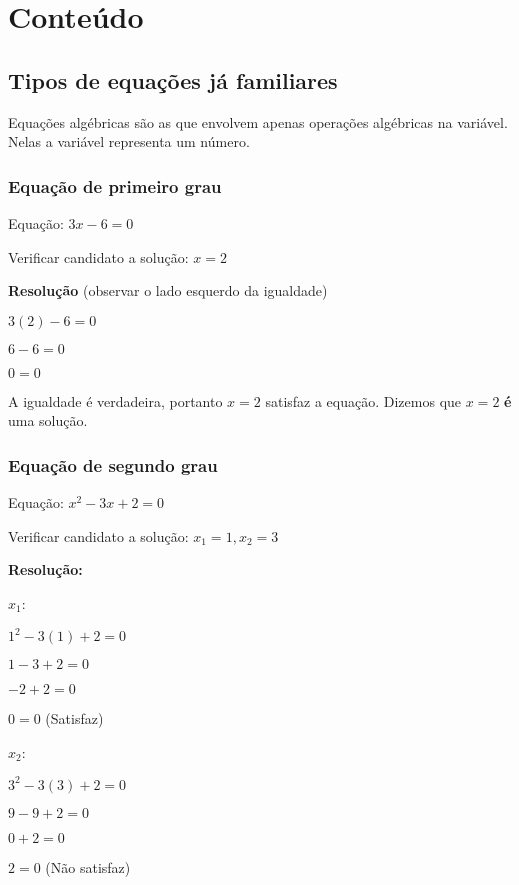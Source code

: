 \documentclass[a4paper]{article}
\begin{document}


\section{Conteúdo}

\subsection{Tipos de equações já familiares}

Equações algébricas são as que envolvem apenas operações algébricas na
variável. Nelas a variável representa um número.

\subsubsection{Equação de primeiro grau}

Equação: $3x -6 = 0$

Verificar candidato a solução: $x=2$

{\bf Resolução} (observar o lado esquerdo da igualdade)

$3(2) - 6 =0$

$ 6-6 =0$

$0 = 0$

A igualdade é verdadeira, portanto $x=2$ satisfaz a equação. Dizemos
que $x=2$ {\bf é} uma solução.

\newpage
\subsubsection{Equação de segundo grau}

Equação: $x^2 - 3x + 2 = 0$

Verificar candidato a solução: $x_1 = 1, x_2 = 3$

{\bf Resolução:}
\begin{multicols}{2}
$x_1$:

$1^2 -3(1) + 2 = 0$

$1 - 3 + 2 = 0$

$-2 + 2 = 0$

$0=0$ (Satisfaz)

\columnbreak

$x_2$:

$3^2 -3(3) +2 = 0$

$9-9+2 = 0 $

$0 + 2 = 0$

$2=0$ (Não satisfaz)

\end{multicols}
\end{document}
